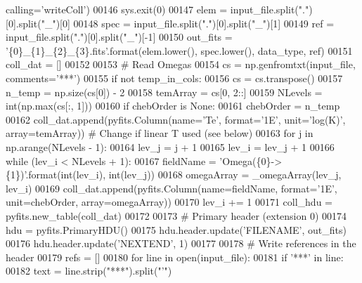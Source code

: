 \begin{DoxyCode}
      calling=\textcolor{stringliteral}{'writeColl'})
00146         sys.exit(0)
00147     elem = input\_file.split(\textcolor{stringliteral}{"."})[0].split(\textcolor{stringliteral}{"\_"})[0]
00148     spec = input\_file.split(\textcolor{stringliteral}{"."})[0].split(\textcolor{stringliteral}{"\_"})[1]
00149     ref = input\_file.split(\textcolor{stringliteral}{"."})[0].split(\textcolor{stringliteral}{"\_"})[-1]
00150     out\_fits = \textcolor{stringliteral}{'\{0\}\_\{1\}\_\{2\}\_\{3\}.fits'}.format(elem.lower(), spec.lower(), data\_type, ref)
00151     coll\_dat = []
00152 
00153     \textcolor{comment}{# Read Omegas}
00154     cs = np.genfromtxt(input\_file, comments=\textcolor{stringliteral}{'***'})
00155     \textcolor{keywordflow}{if} \textcolor{keywordflow}{not} temp\_in\_cols:
00156         cs = cs.transpose()
00157     n\_temp = np.size(cs[0]) - 2
00158     temArray = cs[0, 2::]
00159     NLevels = int(np.max(cs[:, 1]))
00160     \textcolor{keywordflow}{if} chebOrder \textcolor{keywordflow}{is} \textcolor{keywordtype}{None}:
00161         chebOrder = n\_temp
00162     coll\_dat.append(pyfits.Column(name=\textcolor{stringliteral}{'Te'}, format=\textcolor{stringliteral}{'1E'}, unit=\textcolor{stringliteral}{'log(K)'}, array=temArray)) \textcolor{comment}{# Change if
       linear T used (see below)}
00163     \textcolor{keywordflow}{for} j \textcolor{keywordflow}{in} np.arange(NLevels - 1):
00164         lev\_j = j + 1
00165         lev\_i = lev\_j + 1
00166         \textcolor{keywordflow}{while} (lev\_i < NLevels + 1):
00167             fieldName = \textcolor{stringliteral}{'Omega(\{0\}->\{1\})'}.format(int(lev\_i), int(lev\_j))
00168             omegaArray = \_omegaArray(lev\_j, lev\_i)
00169             coll\_dat.append(pyfits.Column(name=fieldName, format=\textcolor{stringliteral}{'1E'}, unit=chebOrder, array=omegaArray))
00170             lev\_i += 1
00171     coll\_hdu = pyfits.new\_table(coll\_dat)        
00172             
00173     \textcolor{comment}{# Primary header (extension 0)}
00174     hdu = pyfits.PrimaryHDU()
00175     hdu.header.update(\textcolor{stringliteral}{'FILENAME'}, out\_fits)
00176     hdu.header.update(\textcolor{stringliteral}{'NEXTEND'}, 1)
00177  
00178     \textcolor{comment}{# Write references in the header}
00179     refs = []
00180     \textcolor{keywordflow}{for} line \textcolor{keywordflow}{in} open(input\_file):
00181         \textcolor{keywordflow}{if} \textcolor{stringliteral}{'***'} \textcolor{keywordflow}{in} line:
00182             text = line.strip(\textcolor{stringliteral}{"***"}).split(\textcolor{stringliteral}{"'"})

\end{DoxyCode}
